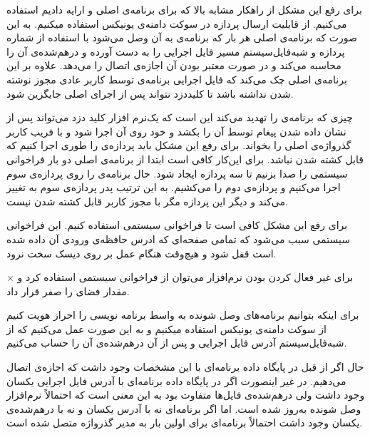 برای رفع این مشکل از راهکار مشابه بالا که برای برنامه‌ی اصلی و  ارایه دادیم استفاده می‌کنیم. از قابلیت ارسال  پردازه در سوکت دامنه‌ی یونیکس استفاده میکنیم. به این صورت که برنامه‌ی اصلی هر بار که برنامه‌ی  به آن وصل می‌شود با استفاده از شماره پردازه و شبه‌فایل‌سیستم  مسیر فایل اجرایی  را به دست آورده و درهم‌شده‌ی آن را محاسبه می‌کند و در صورت معتبر بودن آن اجازه‌ی اتصال را می‌دهد. علاوه بر این برنامه‌ی اصلی چک می‌کند که فایل اجرایی برنامه‌ی  توسط کاربر عادی مجوز نوشته شدن نداشته باشد تا کلیددزد نتواند پس از اجرای  اصلی جایگزین شود.

چیزی که برنامه‌ی  را تهدید می‌کند این است که یک‌نرم افزار کلید دزد می‌تواند پس از نشان داده شدن پیغام توسط  آن را بکشد و خود روی آن  اجرا شود و با فریب کاربر گذرواژه‌ی اصلی را بخواند. برای رفع این مشکل باید پردازه‌ی  را طوری اجرا کنیم که قابل کشته شدن نباشد. برای این‌کار کافی است ابتدا از برنامه‌ی اصلی دو بار فراخوانی سیستمی  را صدا بزنیم تا سه پردازه ایجاد شود. حال برنامه‌ی  را روی پردازه‌ی سوم اجرا می‌کنیم و پردازه‌ی دوم را می‌کشیم. به این ترتیب پدر پردازه‌ی سوم به  تغییر می‌کند و دیگر این پردازه مگر با مجوز کاربر  قابل کشته شدن نیست.



برای رفع این مشکل کافی است تا فراخوانی سیستمی  استفاده کنیم. این فراخوانی سیستمی سبب می‌شود که تمامی صفحه‌ای که ادرس حافظه‌ی ورودی آن داده شده است قفل شود و هیچ‌وقت هنگام عمل  بر روی دیسک سخت نرود.

×
برای غیر فعال کردن  بودن نرم‌افزار می‌توان از فراخوانی سیستمی  استفاده کرد و مقدار فضای  را صفر قرار داد.



برای اینکه بتوانیم برنامه‌های وصل شونده به واسط برنامه نویسی را احراز هویت کنیم از سوکت دامنه‌ی یونیکس استفاده میکنیم و به این صورت عمل می‌کنیم که از شبه‌فایل‌سیستم  آدرس فایل اجرایی و پس از آن درهم‌شده‌ی آن را حساب می‌کنیم. 

حال اگر از قبل در پایگاه داده برنامه‌ای با این مشخصات وجود داشت که اجازه‌ی اتصال می‌دهیم. در غیر اینصورت اگر در پایگاه داده برنامه‌ای با آدرس فایل اجرایی یکسان وجود داشت ولی درهم‌شده‌ی فایل‌ها متفاوت بود به این معنی است که احتمالاً نرم‌افزار وصل شونده به‌روز شده است. اما اگر برنامه‌ای نه با آدرس یکسان و نه با درهم‌شده‌ی یکسان وجود داشت احتمالاً برنامه‌ای برای اولین بار به مدیر گذرواژه متصل شده است.

